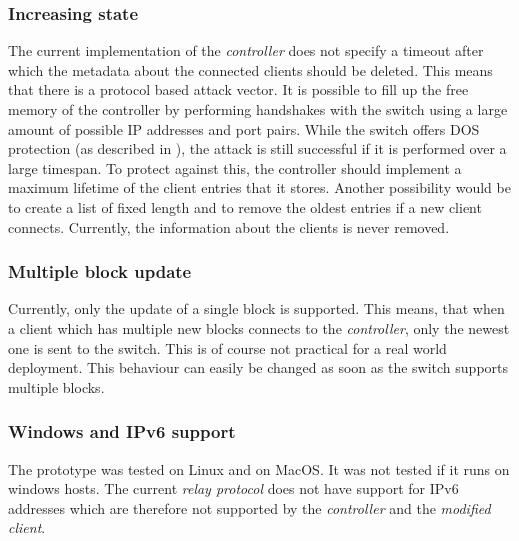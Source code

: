 \subsubsection{Increasing state}
The current implementation of the \textit{controller} does not specify a timeout after which the metadata about the connected clients should be deleted. This means that there is a protocol based attack vector. It is possible to fill up the free memory of the controller by performing handshakes with the switch using a large amount of possible IP addresses and port pairs. While the switch offers DOS protection (as described in \cite{apostolaki2018}), the attack is still successful if it is performed over a large timespan. To protect against this, the controller should implement a maximum lifetime of the client entries that it stores. Another possibility would be to create a list of fixed length and to remove the oldest entries if a new client connects. Currently, the information about the clients is never removed.
\subsubsection{Multiple block update}
Currently, only the update of a single block is supported. This means, that when a client which has multiple new blocks connects to the \textit{controller}, only the newest one is sent to the switch. This is of course not practical for a real world deployment. This behaviour can easily be changed as soon as the switch supports multiple blocks.
\subsubsection{Windows and IPv6 support}
The prototype was tested on Linux and on MacOS. It was not tested if it runs on windows hosts. The current \textit{relay protocol} does not have support for IPv6 addresses which are therefore not supported by the \textit{controller} and the \textit{modified client}.































